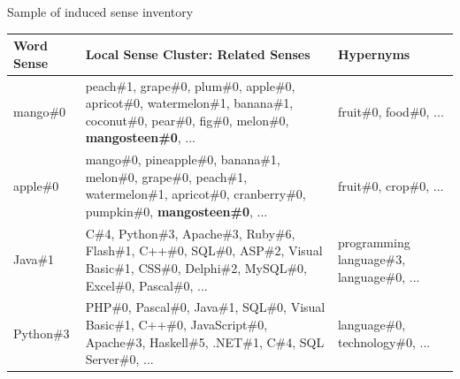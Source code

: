 \documentclass[usenames,dvipsnames]{beamer}
\begin{document}
	
\begin{frame}{Sample of induced sense inventory}


\begin{table}
\centering
\scriptsize
\begin{tabular}{l|p{6cm}|p{2.5cm}} 
\bf Word Sense & \bf Local Sense Cluster: Related Senses & \bf Hypernyms \\
\toprule
 \alert{mango\#0} &  peach\#1, grape\#0, plum\#0, apple\#0, apricot\#0, watermelon\#1, banana\#1, coconut\#0, pear\#0, fig\#0, melon\#0,  \alert{\textbf{mangosteen\#0}}, ... & fruit\#0, food\#0, ... \\
 
\midrule
\alert{apple\#0} & mango\#0, pineapple\#0, banana\#1, melon\#0, grape\#0, peach\#1, watermelon\#1, apricot\#0, cranberry\#0, pumpkin\#0, \alert{\textbf{mangosteen\#0}}, ... & fruit\#0, crop\#0,  ... \\

\midrule
Java\#1 & C\#4, Python\#3, Apache\#3, Ruby\#6, Flash\#1, C++\#0, SQL\#0, ASP\#2, Visual Basic\#1, CSS\#0, Delphi\#2, MySQL\#0, Excel\#0, Pascal\#0, ... & programming language\#3, language\#0, ... \\

\midrule
Python\#3 & PHP\#0, Pascal\#0, Java\#1, SQL\#0, Visual Basic\#1, C++\#0, JavaScript\#0, Apache\#3, Haskell\#5, .NET\#1, C\#4, SQL Server\#0, ... & language\#0, technology\#0, ... \\

\end{tabular}


\end{table}



\end{frame}
\end{document}
